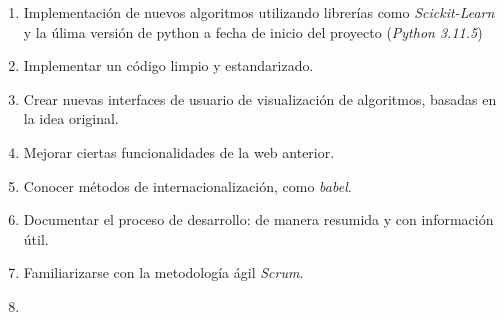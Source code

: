 \begin{enumerate}
	\item Implementación de nuevos algoritmos utilizando librerías como \textit{Scickit-Learn} y la úlima versión de python a fecha de inicio del proyecto (\textit{Python 3.11.5})
	\item Implementar un código limpio y estandarizado.
	\item Crear nuevas interfaces de usuario de visualización de algoritmos, basadas en la idea original.
	\item Mejorar ciertas funcionalidades de la web anterior.
	\item Conocer métodos de internacionalización, como \textit{babel}.
	\item Documentar el proceso de desarrollo: de manera resumida y con información útil.
	\item Familiarizarse con la metodología ágil \textit{Scrum}.
	\item 
\end{enumerate}
